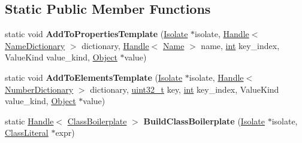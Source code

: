\subsection*{Static Public Member Functions}
\begin{DoxyCompactItemize}
\item 
\mbox{\label{classv8_1_1internal_1_1ClassBoilerplate_a18ddc4d07c601e3cd0b74baf4686bd29}} 
static void {\bfseries Add\+To\+Properties\+Template} (\mbox{\hyperlink{classv8_1_1internal_1_1Isolate}{Isolate}} $\ast$isolate, \mbox{\hyperlink{classv8_1_1internal_1_1Handle}{Handle}}$<$ \mbox{\hyperlink{classv8_1_1internal_1_1NameDictionary}{Name\+Dictionary}} $>$ dictionary, \mbox{\hyperlink{classv8_1_1internal_1_1Handle}{Handle}}$<$ \mbox{\hyperlink{classv8_1_1internal_1_1Name}{Name}} $>$ name, \mbox{\hyperlink{classint}{int}} key\+\_\+index, Value\+Kind value\+\_\+kind, \mbox{\hyperlink{classv8_1_1internal_1_1Object}{Object}} $\ast$value)
\item 
\mbox{\label{classv8_1_1internal_1_1ClassBoilerplate_a0f8f41d95056b0bca061f0e61a060d6c}} 
static void {\bfseries Add\+To\+Elements\+Template} (\mbox{\hyperlink{classv8_1_1internal_1_1Isolate}{Isolate}} $\ast$isolate, \mbox{\hyperlink{classv8_1_1internal_1_1Handle}{Handle}}$<$ \mbox{\hyperlink{classv8_1_1internal_1_1NumberDictionary}{Number\+Dictionary}} $>$ dictionary, \mbox{\hyperlink{classuint32__t}{uint32\+\_\+t}} key, \mbox{\hyperlink{classint}{int}} key\+\_\+index, Value\+Kind value\+\_\+kind, \mbox{\hyperlink{classv8_1_1internal_1_1Object}{Object}} $\ast$value)
\item 
\mbox{\label{classv8_1_1internal_1_1ClassBoilerplate_a0b1c217c1864f4b9e76206cded31250e}} 
static \mbox{\hyperlink{classv8_1_1internal_1_1Handle}{Handle}}$<$ \mbox{\hyperlink{classv8_1_1internal_1_1ClassBoilerplate}{Class\+Boilerplate}} $>$ {\bfseries Build\+Class\+Boilerplate} (\mbox{\hyperlink{classv8_1_1internal_1_1Isolate}{Isolate}} $\ast$isolate, \mbox{\hyperlink{classv8_1_1internal_1_1ClassLiteral}{Class\+Literal}} $\ast$expr)
\end{DoxyCompactItemize}

